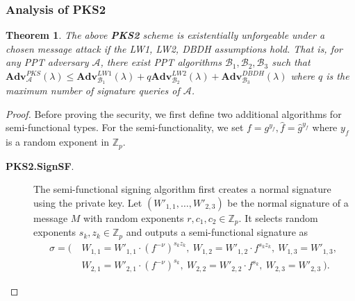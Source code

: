\documentclass[11pt,letterpaper]{article}
\newtheorem{theorem}{Theorem}[section]
\newcommand{\Z}{\mathbb{Z}}
\newcommand{\Adv}{\textbf{Adv}}
\newcommand{\mc}[1]{\mathcal{#1}}
\newcommand{\tb}[1]{\textbf{#1}}
\begin{document}
\subsubsection{Analysis of PKS2}

\begin{theorem} \label{thm:pks2-prime}
The above \tb{PKS2} scheme is existentially unforgeable under a chosen
message attack if the LW1, LW2, DBDH assumptions hold. That is, for any PPT
adversary $\mc{A}$, there exist PPT algorithms $\mc{B}_1, \mc{B}_2, \mc{B}_3$
such that
    $\Adv_{\mc{A}}^{PKS}(\lambda)
    \leq \Adv_{\mc{B}_1}^{LW1}(\lambda) + q \Adv_{\mc{B}_2}^{LW2}(\lambda) +
        \Adv_{\mc{B}_3}^{DBDH}(\lambda)$
where $q$ is the maximum number of signature queries of $\mc{A}$.
\end{theorem}

\begin{proof}
Before proving the security, we first define two additional algorithms for
semi-functional types. For the semi-functionality, we set $f = g^{y_f},
\hat{f} = \hat{g}^{y_f}$ where $y_f$ is a random exponent in $\Z_p$.

\begin{description}
\item [\tb{PKS2.SignSF}.] The semi-functional signing algorithm first
    creates a normal signature using the private key. Let $(W'_{1,1},
    \ldots, W'_{2,3})$ be the normal signature of a message $M$ with random
    exponents $r, c_1, c_2 \in \Z_p$. It selects random exponents $s_k, z_k
    \in \Z_p$ and outputs a semi-functional signature as
    \begin{align*}
    \sigma = \Big(~
    &   W_{1,1} = W'_{1,1} \cdot (f^{-{\nu}})^{s_k z_k},~
        W_{1,2} = W'_{1,2} \cdot f^{s_k z_k},~
        W_{1,3} = W'_{1,3},~\\
    &   W_{2,1} = W'_{2,1} \cdot (f^{-{\nu}})^{s_k},~
        W_{2,2} = W'_{2,2} \cdot f^{s_k},~
        W_{2,3} = W'_{2,3}
    ~\Big).
    \end{align*}


\end{description}
\end{proof}
\end{document}
